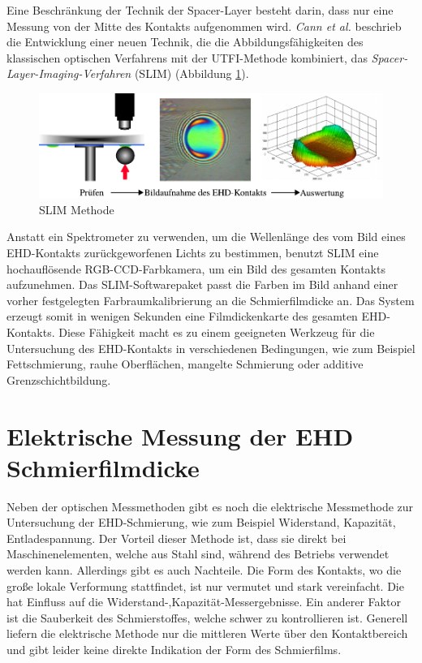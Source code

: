 Eine Beschränkung der Technik der Spacer-Layer besteht darin, dass nur eine Messung von der Mitte des Kontakts aufgenommen wird.
\textit{Cann et al.} \cite{cann_1996} beschrieb die Entwicklung einer neuen Technik, die die Abbildungsfähigkeiten des klassischen optischen Verfahrens mit der UTFI-Methode kombiniert, das \textit{Spacer-Layer-Imaging-Verfahren} (SLIM) (Abbildung \ref{fig:ehd_slim_methode}).
\begin{figure}[htb]
    \centering
    \includegraphics[]{./images/slim_methode.pdf}
    \caption{SLIM Methode \cite{ehl_broshure}}
    \label{fig:ehd_slim_methode}
\end{figure}
%

Anstatt ein Spektrometer zu verwenden, um die Wellenlänge des vom Bild eines EHD-Kontakts zurückgeworfenen Lichts zu bestimmen, benutzt SLIM eine hochauflösende RGB-CCD-Farbkamera, um ein Bild des gesamten Kontakts aufzunehmen.
Das SLIM-Softwarepaket passt die Farben im Bild anhand einer vorher festgelegten Farbraumkalibrierung an die Schmierfilmdicke an.
Das System erzeugt somit in wenigen Sekunden eine Filmdickenkarte des gesamten EHD-Kontakts.
Diese Fähigkeit macht es zu einem geeigneten Werkzeug für die Untersuchung des EHD-Kontakts in verschiedenen Bedingungen, wie zum Beispiel Fettschmierung, rauhe Oberflächen, mangelte Schmierung oder additive Grenzschichtbildung.

\section{Elektrische Messung der EHD Schmierfilmdicke}
\label{sec:elektrische_messung_der_ehd_schmierfilmdicke}

Neben der optischen Messmethoden gibt es noch die elektrische Messmethode zur Untersuchung der EHD-Schmierung, wie zum Beispiel Widerstand, Kapazität, Entladespannung.
Der Vorteil dieser Methode ist, dass sie direkt bei Maschinenelementen, welche aus Stahl sind, während des Betriebs verwendet werden kann.
Allerdings gibt es auch Nachteile.
Die Form des Kontakts, wo die große lokale Verformung stattfindet, ist nur vermutet und stark vereinfacht.
Die hat Einfluss auf die Widerstand-,Kapazität-Messergebnisse.
Ein anderer Faktor ist die Sauberkeit des Schmierstoffes, welche schwer zu kontrollieren ist.
Generell liefern die elektrische Methode nur die mittleren Werte über den Kontaktbereich und gibt leider keine direkte Indikation der Form des Schmierfilms.

